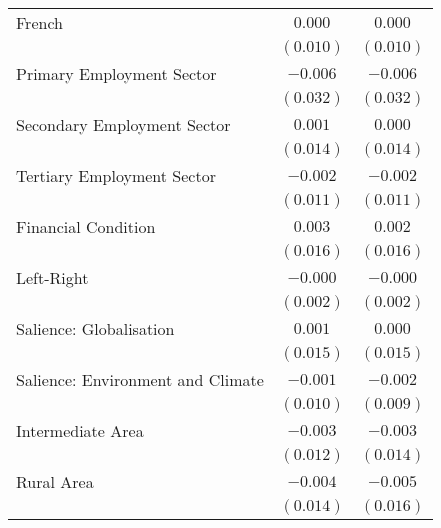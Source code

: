 \begin{center}
\begin{tiny}
\begin{longtable}{l@{} c@{} c@{}}
\quad French                                           & $0.000$         & $0.000$        \\
                                                       & $(0.010)$       & $(0.010)$      \\
\quad Primary Employment Sector                        & $-0.006$        & $-0.006$       \\
                                                       & $(0.032)$       & $(0.032)$      \\
\quad Secondary Employment Sector                      & $0.001$         & $0.000$        \\
                                                       & $(0.014)$       & $(0.014)$      \\
\quad Tertiary Employment Sector                       & $-0.002$        & $-0.002$       \\
                                                       & $(0.011)$       & $(0.011)$      \\
\quad Financial Condition                              & $0.003$         & $0.002$        \\
                                                       & $(0.016)$       & $(0.016)$      \\
\quad Left-Right                                       & $-0.000$        & $-0.000$       \\
                                                       & $(0.002)$       & $(0.002)$      \\
\quad Salience: Globalisation                          & $0.001$         & $0.000$        \\
                                                       & $(0.015)$       & $(0.015)$      \\
\quad Salience: Environment and Climate                & $-0.001$        & $-0.002$       \\
                                                       & $(0.010)$       & $(0.009)$      \\
\quad Intermediate Area                                & $-0.003$        & $-0.003$       \\
                                                       & $(0.012)$       & $(0.014)$      \\
\quad Rural Area                                       & $-0.004$        & $-0.005$       \\
                                                       & $(0.014)$       & $(0.016)$      \\

\end{longtable}
\end{tiny}
\end{center}
